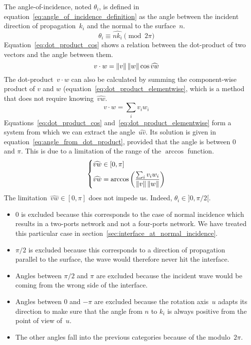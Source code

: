 The angle-of-incidence, noted $\theta_i$, is defined in equation~\eqref{eq:angle_of_incidence_definition} as the angle between the incident direction of propagation~$k_i$ and the normal to the surface~$n$.
\begin{equation}
    \theta_i \equiv \widehat{n k_i} \pmod{2\pi}
    \label{eq:angle_of_incidence_definition}
\end{equation}
Equation~\eqref{eq:dot_product_cos} shows a relation between the dot-product of two vectors and the angle between them.
\begin{equation}
    v \cdot w = \left\| v \right\| \left\| w \right\| \cos \widehat{vw}
    \label{eq:dot_product_cos}
\end{equation}
The dot-product~$v \cdot w$ can also be calculated by summing the component-wise product of $v$ and $w$ (equation~\eqref{eq:dot_product_elementwise}, which is a method that does not require knowing~$\widehat{vw}$.
\begin{equation}
    v \cdot w = \sum_i v_i w_i
    \label{eq:dot_product_elementwise}
\end{equation}
Equations~\eqref{eq:dot_product_cos} and~\eqref{eq:dot_product_elementwise} form a system from which we can extract the angle~$\widehat{uv}$.
Its solution is given in equation~\eqref{eq:angle_from_dot_product}, provided that the angle is between 0 and $\pi$.
This is due to a limitation of the range of the $\arccos$ function.
\begin{equation}
    \left\lbrace
        \begin{aligned}
            \widehat{vw} &\in [0, \pi]
            \\
            \widehat{vw} &= \arccos
            \left(
                \frac{
                    \sum_i v_i w_i
                }{
                    \left\| v \right\| \left\| w \right\|
                }
            \right)
        \end{aligned}
    \right.
    \label{eq:angle_from_dot_product}
\end{equation}
The limitation~$\widehat{vw} \in [0, \pi]$ does not impede us.
Indeed, $\theta_i \in ]0, \pi/2[$.
\begin{itemize}
    \item 0 is excluded because this corresponds to the case of normal incidence which results in a two-ports network and not a four-ports network.  We have treated this particular case in section~\vref{sec:interface_at_normal_incidence}.
    \item $\pi/2$ is excluded because this corresponds to a direction of propagation parallel to the surface, the wave would therefore never hit the interface.
    \item Angles between $\pi/2$ and $\pi$ are excluded because the incident wave would be coming from the wrong side of the interface.
    \item Angles between 0 and $-\pi$ are excluded because the rotation axis~$u$ adapts its direction to make sure that the angle from $n$ to $k_i$ is always positive from the point of view of~$u$.
    \item The other angles fall into the previous categories because of the modulo~$2\pi$.
\end{itemize}

